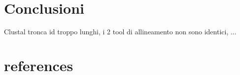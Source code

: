 \documentclass[11pt,italian]{article}
\begin{document}
\section{Conclusioni}
Clustal tronca id troppo lunghi, i 2 tool di allineamento non sono identici, ...

\section{references}
\end{document}
